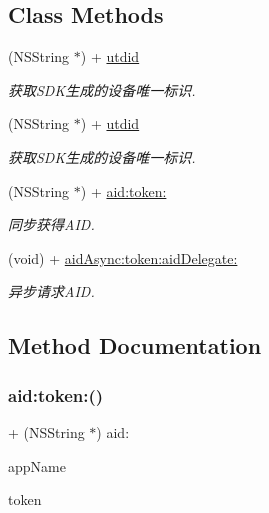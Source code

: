\subsection*{Class Methods}
\begin{DoxyCompactItemize}
\item 
(N\+S\+String $\ast$) + \mbox{\hyperlink{interface_u_t_device_a679ac9f6e75a769943db507089abb879}{utdid}}
\begin{DoxyCompactList}\small\item\em 获取\+S\+D\+K生成的设备唯一标识. \end{DoxyCompactList}\item 
(N\+S\+String $\ast$) + \mbox{\hyperlink{interface_u_t_device_a679ac9f6e75a769943db507089abb879}{utdid}}
\begin{DoxyCompactList}\small\item\em 获取\+S\+D\+K生成的设备唯一标识. \end{DoxyCompactList}\item 
(N\+S\+String $\ast$) + \mbox{\hyperlink{interface_u_t_device_a5c96a441650c66ed5454615fa2b3bbfe}{aid\+:token\+:}}
\begin{DoxyCompactList}\small\item\em 同步获得\+A\+ID. \end{DoxyCompactList}\item 
(void) + \mbox{\hyperlink{interface_u_t_device_a3298d219e8f1c7d2de24e68828cf347b}{aid\+Async\+:token\+:aid\+Delegate\+:}}
\begin{DoxyCompactList}\small\item\em 异步请求\+A\+ID. \end{DoxyCompactList}\end{DoxyCompactItemize}


\subsection{Method Documentation}
\mbox{\label{interface_u_t_device_a5c96a441650c66ed5454615fa2b3bbfe}} 
\subsubsection{\texorpdfstring{aid\+:token\+:()}{aid:token:()}}
{\footnotesize\ttfamily + (N\+S\+String $\ast$) aid\+: \begin{DoxyParamCaption}\item[{(N\+S\+String $\ast$)}]{app\+Name }\item[{token:(N\+S\+String $\ast$)}]{token }\end{DoxyParamCaption}}



